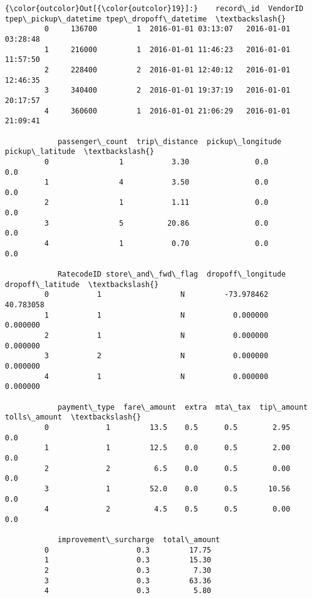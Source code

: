 \documentclass[11pt]{article}
\begin{document}
\begin{Verbatim}[commandchars=\\\{\}]
{\color{outcolor}Out[{\color{outcolor}19}]:}    record\_id  VendorID tpep\_pickup\_datetime tpep\_dropoff\_datetime  \textbackslash{}
         0     136700         1  2016-01-01 03:13:07   2016-01-01 03:28:48   
         1     216000         1  2016-01-01 11:46:23   2016-01-01 11:57:50   
         2     228400         2  2016-01-01 12:40:12   2016-01-01 12:46:35   
         3     340400         2  2016-01-01 19:37:19   2016-01-01 20:17:57   
         4     360600         1  2016-01-01 21:06:29   2016-01-01 21:09:41   
         
            passenger\_count  trip\_distance  pickup\_longitude  pickup\_latitude  \textbackslash{}
         0                1           3.30               0.0              0.0   
         1                4           3.50               0.0              0.0   
         2                1           1.11               0.0              0.0   
         3                5          20.86               0.0              0.0   
         4                1           0.70               0.0              0.0   
         
            RatecodeID store\_and\_fwd\_flag  dropoff\_longitude  dropoff\_latitude  \textbackslash{}
         0           1                  N         -73.978462         40.783058   
         1           1                  N           0.000000          0.000000   
         2           1                  N           0.000000          0.000000   
         3           2                  N           0.000000          0.000000   
         4           1                  N           0.000000          0.000000   
         
            payment\_type  fare\_amount  extra  mta\_tax  tip\_amount  tolls\_amount  \textbackslash{}
         0             1         13.5    0.5      0.5        2.95           0.0   
         1             1         12.5    0.0      0.5        2.00           0.0   
         2             2          6.5    0.0      0.5        0.00           0.0   
         3             1         52.0    0.0      0.5       10.56           0.0   
         4             2          4.5    0.5      0.5        0.00           0.0   
         
            improvement\_surcharge  total\_amount  
         0                    0.3         17.75  
         1                    0.3         15.30  
         2                    0.3          7.30  
         3                    0.3         63.36  
         4                    0.3          5.80  
\end{Verbatim}
            
\end{document}
